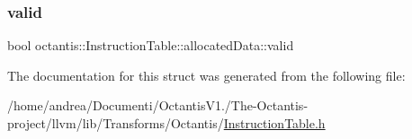 \mbox{\label{structoctantis_1_1InstructionTable_1_1allocatedData_aa1655d3d2df0738a28ed8f722151f347}} 
\subsubsection{\texorpdfstring{valid}{valid}}
{\footnotesize\ttfamily bool octantis\+::\+Instruction\+Table\+::allocated\+Data\+::valid}



The documentation for this struct was generated from the following file\+:\begin{DoxyCompactItemize}
\item 
/home/andrea/\+Documenti/\+Octantis\+V1./\+The-\/\+Octantis-\/project/llvm/lib/\+Transforms/\+Octantis/\hyperlink{InstructionTable_8h}{Instruction\+Table.\+h}\end{DoxyCompactItemize}
